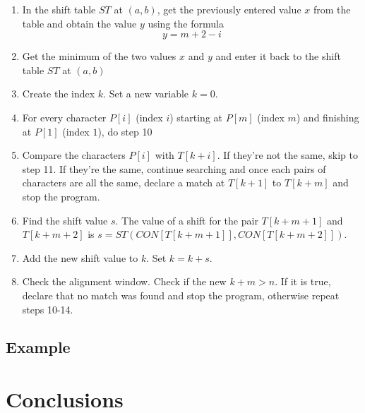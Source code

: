 \begin{enumerate}
	\item In the shift table $ST$ at $(a, b)$, get the previously entered value $x$ from the table and obtain the value $y$ using the formula $$ y = m+2-i $$

	\item Get the minimum of the two values $x$ and $y$ and enter it back to the shift table $ST$ at $(a, b)$

\item Create the index $k$. Set a new variable $k=0$.

\item For every character $P[i]$ (index $i$) starting at $P[m]$ (index $m$) and finishing at $P[1]$ (index $1$), do step 10 
	
	\item Compare the characters $P[i]$ with $T[k + i]$. If they're not the same, skip to step 11. If they're the same, continue searching and once each pairs of characters are all the same, declare a match at $T[k+1]$ to $T[k+m]$ and stop the program.

\item Find the shift value $s$. The value of a shift for the pair $T [k +m+ 1]$ and $T [k +m+ 2]$ is $s = ST (CON[T[k + m+ 1]], CON[ T [k +m+ 2]])$. 
	
\item Add the new shift value to $k$. Set $k=k+s$.

\item Check the alignment window. Check if the new $k+m > n$. If it is true, declare that no match was found and stop the program, otherwise repeat steps 10-14. 

\end{enumerate}
\subsection{Example}

\section{Conclusions}

